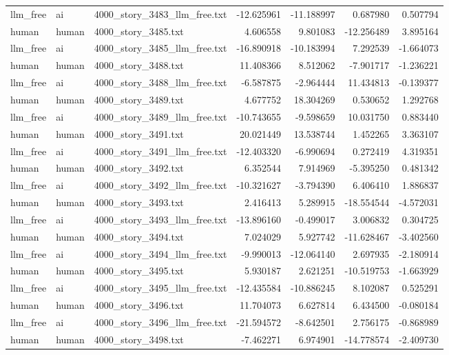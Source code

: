 \begin{longtable}{lllrrrr}
llm\_free & ai & 4000\_story\_3483\_llm\_free.txt & -12.625961 & -11.188997 & 0.687980 & 0.507794 \\
human & human & 4000\_story\_3485.txt & 4.606558 & 9.801083 & -12.256489 & 3.895164 \\
llm\_free & ai & 4000\_story\_3485\_llm\_free.txt & -16.890918 & -10.183994 & 7.292539 & -1.664073 \\
human & human & 4000\_story\_3488.txt & 11.408366 & 8.512062 & -7.901717 & -1.236221 \\
llm\_free & ai & 4000\_story\_3488\_llm\_free.txt & -6.587875 & -2.964444 & 11.434813 & -0.139377 \\
human & human & 4000\_story\_3489.txt & 4.677752 & 18.304269 & 0.530652 & 1.292768 \\
llm\_free & ai & 4000\_story\_3489\_llm\_free.txt & -10.743655 & -9.598659 & 10.031750 & 0.883440 \\
human & human & 4000\_story\_3491.txt & 20.021449 & 13.538744 & 1.452265 & 3.363107 \\
llm\_free & ai & 4000\_story\_3491\_llm\_free.txt & -12.403320 & -6.990694 & 0.272419 & 4.319351 \\
human & human & 4000\_story\_3492.txt & 6.352544 & 7.914969 & -5.395250 & 0.481342 \\
llm\_free & ai & 4000\_story\_3492\_llm\_free.txt & -10.321627 & -3.794390 & 6.406410 & 1.886837 \\
human & human & 4000\_story\_3493.txt & 2.416413 & 5.289915 & -18.554544 & -4.572031 \\
llm\_free & ai & 4000\_story\_3493\_llm\_free.txt & -13.896160 & -0.499017 & 3.006832 & 0.304725 \\
human & human & 4000\_story\_3494.txt & 7.024029 & 5.927742 & -11.628467 & -3.402560 \\
llm\_free & ai & 4000\_story\_3494\_llm\_free.txt & -9.990013 & -12.064140 & 2.697935 & -2.180914 \\
human & human & 4000\_story\_3495.txt & 5.930187 & 2.621251 & -10.519753 & -1.663929 \\
llm\_free & ai & 4000\_story\_3495\_llm\_free.txt & -12.435584 & -10.886245 & 8.102087 & 0.525291 \\
human & human & 4000\_story\_3496.txt & 11.704073 & 6.627814 & 6.434500 & -0.080184 \\
llm\_free & ai & 4000\_story\_3496\_llm\_free.txt & -21.594572 & -8.642501 & 2.756175 & -0.868989 \\
human & human & 4000\_story\_3498.txt & -7.462271 & 6.974901 & -14.778574 & -2.409730 \\

\end{longtable}
